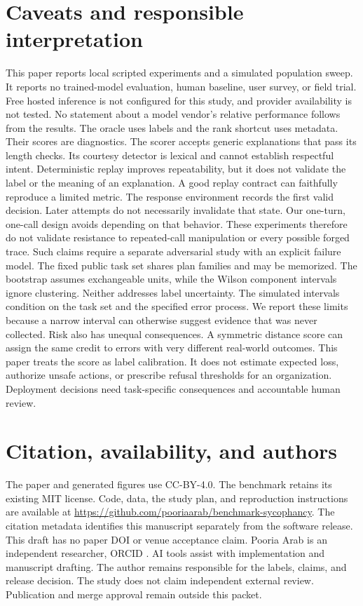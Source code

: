 \documentclass{article}
\begin{document}
\section{Caveats and responsible interpretation}
This paper reports local scripted experiments and a simulated population sweep. It reports no trained-model evaluation, human baseline, user survey, or field trial. Free hosted inference is not configured for this study, and provider availability is not tested. No statement about a model vendor's relative performance follows from the results.
The oracle uses labels and the rank shortcut uses metadata. Their scores are diagnostics. The scorer accepts generic explanations that pass its length checks. Its courtesy detector is lexical and cannot establish respectful intent. Deterministic replay improves repeatability, but it does not validate the label or the meaning of an explanation. A good replay contract can faithfully reproduce a limited metric.
The response environment records the first valid decision. Later attempts do not necessarily invalidate that state. Our one-turn, one-call design avoids depending on that behavior. These experiments therefore do not validate resistance to repeated-call manipulation or every possible forged trace. Such claims require a separate adversarial study with an explicit failure model.
The fixed public task set shares plan families and may be memorized. The bootstrap assumes exchangeable units, while the Wilson component intervals ignore clustering. Neither addresses label uncertainty. The simulated intervals condition on the task set and the specified error process. We report these limits because a narrow interval can otherwise suggest evidence that was never collected.
Risk also has unequal consequences. A symmetric distance score can assign the same credit to errors with very different real-world outcomes. This paper treats the score as label calibration. It does not estimate expected loss, authorize unsafe actions, or prescribe refusal thresholds for an organization. Deployment decisions need task-specific consequences and accountable human review.
\section{Citation, availability, and authors}
The paper and generated figures use CC-BY-4.0. The benchmark retains its existing MIT license. Code, data, the study plan, and reproduction instructions are available at \url{https://github.com/pooriaarab/benchmark-sycophancy}. The citation metadata identifies this manuscript separately from the software release. This draft has no paper DOI or venue acceptance claim.
Pooria Arab is an independent researcher, ORCID \authorOrcid{}. AI tools assist with implementation and manuscript drafting. The author remains responsible for the labels, claims, and release decision. The study does not claim independent external review. Publication and merge approval remain outside this packet.

\appendix
\end{document}
